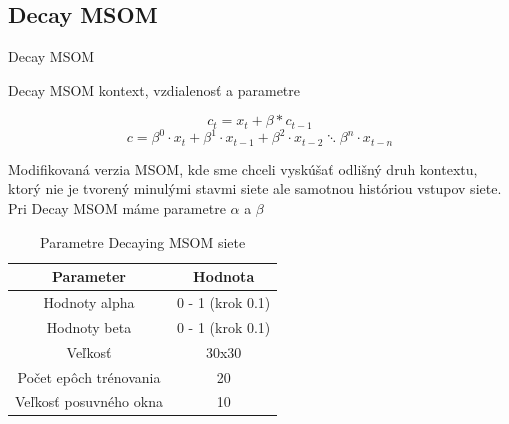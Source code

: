 \documentclass[10pt]{beamer}
\begin{document}
\subsection{Decay MSOM}
\begin{frame}[fragile]{Decay MSOM}

  \begin{block}{Decay MSOM kontext, vzdialenosť a parametre}
    
    \begin{equation} 
      c_{t} = x_{t} + \beta * c_{t-1}
    \end{equation}
    \begin{equation}
      c = \beta^{0} \cdot x_{t} + \beta^{1} \cdot x_{t-1} + 
      \beta^{2} \cdot x_{t-2} \ddots \beta^{n} \cdot x_{t-n}
    \end{equation}

    Modifikovaná verzia MSOM, kde sme chceli vyskúšať odlišný druh 
    kontextu, ktorý nie je tvorený minulými stavmi siete ale samotnou históriou vstupov siete.
    Pri Decay MSOM máme parametre $\alpha$ a $\beta$
  \end{block}
    \begin{table}[h!]
      \centering
      \begin{tabular}{|c|c|} 
       \hline
       Parameter & Hodnota \\ 
       \hline\hline
       Hodnoty alpha & 0 - 1 (krok 0.1)  \\ 
       \hline
       Hodnoty beta & 0 - 1  (krok 0.1) \\ 
       \hline
       Veľkosť & 30x30  \\
       \hline
       Počet epôch trénovania & 20  \\
       \hline
       Veľkosť posuvného okna & 10 \\
       \hline
      \end{tabular}
      \caption{Parametre Decaying MSOM siete}
    \end{table}
\end{frame}
\end{document}
